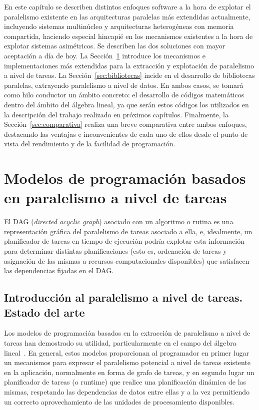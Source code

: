 En este capítulo se describen distintos enfoques software a la hora de
explotar el paralelismo existente en las arquitecturas paralelas más
extendidas actualmente, incluyendo sistemas multinúcleo y arquitecturas
heterogéneas con memoria compartida, haciendo especial hincapié en los
mecanismos existentes a la hora de explotar sistemas asimétricos. Se
describen las dos soluciones con mayor aceptación a día de hoy.  La
Sección~\ref{sec:tareas} introduce los mecanismos e implementaciones más
extendidas para la extracción y explotación de paralelismo a nivel de
tareas.  La Sección~\ref{sec:bibliotecas} incide en el desarrollo de
bibliotecas paralelas, extrayendo paralelismo a nivel de datos.  En ambos
casos, se tomará como hilo conductor un ámbito concreto: el desarrollo de
códigos matemáticos dentro del ámbito del álgebra lineal, ya que serán
estos códigos los utilizados en la descripción del trabajo realizado en
próximos capítulos.  Finalmente, la Sección~\ref{sec:comparativa} realiza
una breve comparativa entre ambos enfoques, destacando las ventajas e
inconvenientes de cada uno de ellos desde el punto de vista del rendimiento
y de la facilidad de programación.


\section{Modelos de programación basados en paralelismo a nivel de tareas}
\label{sec:tareas}

El DAG (\emph{directed acyclic graph}) asociado con un algoritmo o rutina es
una representación gráfica del paralelismo de tareas asociado a ella, e,
idealmente, un planificador de tareas en tiempo de ejecución podría
explotar esta información para determinar distintas planificaciones (esto
es, ordenación de tareas y asignación de las mismas a recursos
computacionales disponibles) que satisfacen las dependencias fijadas en el
DAG.

\subsection{Introducción al paralelismo a nivel de tareas. Estado del arte}

Los modelos de programación basados en la extracción de paralelismo a nivel
de tareas han demostrado su utilidad, particularmente en el campo del
álgebra lineal~\cite{Abalenkovs}. En general, estos modelos proporcionan al
programador en primer lugar un mecanismos para expresar el paralelismo
potencial a nivel de tareas existente en la aplicación, normalmente en
forma de grafo de tareas, y en segundo lugar un planificador de tareas (o
runtime) que realice una planificación dinámica de las mismas, respetando
las dependencias de datos entre ellas y a la vez permitiendo un correcto
aprovechamiento de las unidades de procesamiento disponibles.

